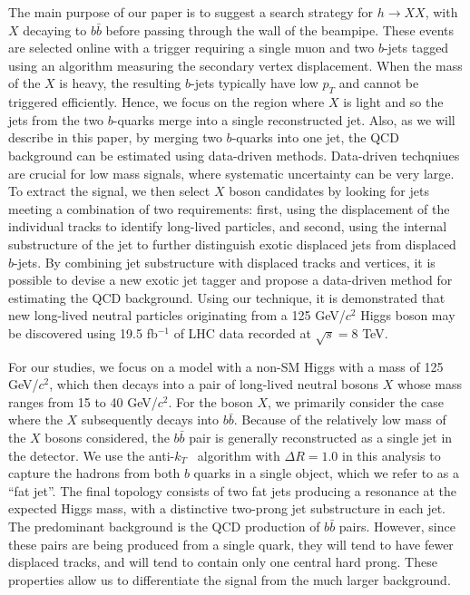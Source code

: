 \documentclass{JHEP3}
\begin{document}
The main purpose of our paper is to suggest a search strategy for $h\to XX$, with $X$ decaying to $b\bar{b}$
before passing through the wall of the beampipe.  These events are selected online with a trigger requiring a
single muon and two $b$-jets tagged using an algorithm measuring the secondary vertex displacement. When the
mass of the $X$ is heavy, the resulting $b$-jets typically have low $p_{T}$ and cannot be triggered
efficiently. Hence, we focus on the region where $X$ is light and so the jets from the two $b$-quarks merge
into a single reconstructed jet. Also, as we will describe in this paper, by merging two $b$-quarks into one
jet, the QCD background can be estimated using data-driven methods. Data-driven techqniues are crucial for low
mass signals, where systematic uncertainty can be very large. To extract the signal, we then select $X$ boson
candidates by looking for jets meeting a combination of two requirements: first, using the displacement of the
individual tracks to identify long-lived particles, and second, using the internal substructure of the jet to
further distinguish exotic displaced jets from displaced $b$-jets. By combining jet substructure with
displaced tracks and vertices, it is possible to devise a new exotic jet tagger and propose a data-driven
method for estimating the QCD background.  Using our technique, it is demonstrated that new long-lived neutral
particles originating from a 125 GeV/$c^2$ Higgs boson may be discovered using 19.5 fb$^{-1}$ of LHC data
recorded at $\sqrt{s} = 8$ TeV.

For our studies, we focus on a model with a non-SM Higgs with a mass of 125 GeV/$c^2$, which then decays into a
pair of long-lived neutral bosons $X$ whose mass ranges from 15 to 40 GeV/$c^2$. For the boson $X$, we
primarily consider the case where the $X$ subsequently decays into $b\bar{b}$. Because of the relatively
low mass of the $X$ bosons considered, the $b\bar{b}$ pair is generally reconstructed as a single jet in
the detector. We use the anti-$k_T$~\cite{Cacciari:2008gp} algorithm with $\Delta R=1.0$ in this
analysis to capture the hadrons from both $b$ quarks in a single object, which we refer to as a ``fat
jet''.  The final topology consists of two fat jets producing a resonance at the expected Higgs mass,
with a distinctive two-prong jet substructure in each jet. The predominant background is the QCD
production of $b\bar{b}$ pairs.  However, since these pairs are being produced from a single quark, they
will tend to have fewer displaced tracks, and will tend to contain only one central hard prong. These
properties allow us to differentiate the signal from the much larger background.
\end{document}
